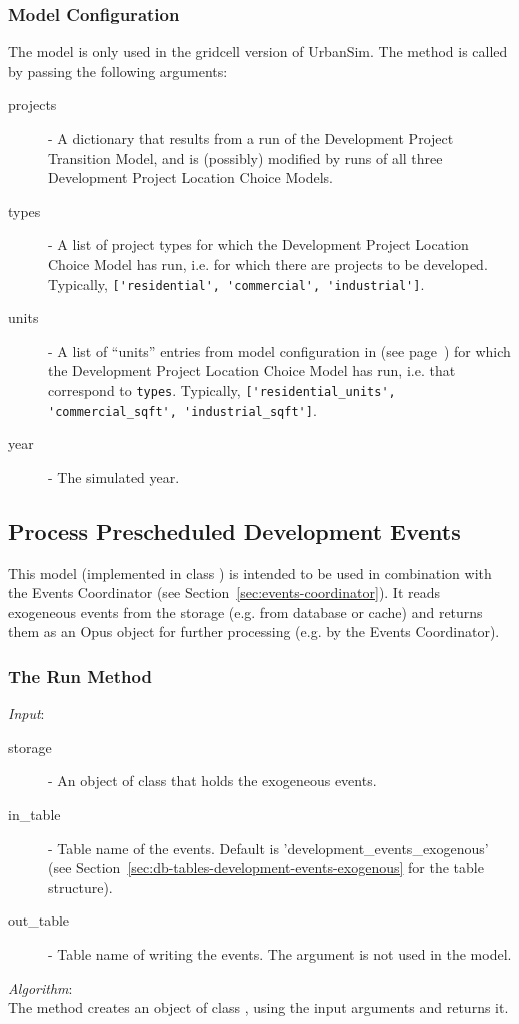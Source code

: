 \subsubsection{Model Configuration}
%
The model is only used in the gridcell version of UrbanSim.
The  method is called by
passing the following arguments:
\begin{description}
\item[projects] - A dictionary that results from a run of the Development
  Project Transition Model,  and is (possibly) modified by runs of all three
  Development Project Location Choice Models. 
\item[types] - A list of project types for which the Development Project
  Location Choice Model has run, i.e. for which there are projects to be
  developed. Typically, \verb|['residential', 'commercial', 'industrial']|.
\item[units] - A list of ``units'' entries from model configuration in
   (see page~\pageref{page:model-configuration}) for which the
  Development Project Location Choice Model has run, i.e. that correspond to
  \verb|types|. Typically, \verb|['residential_units', 'commercial_sqft', 'industrial_sqft']|.
\item[year] - The simulated year.
\end{description}

%
\subsection{Process Prescheduled Development Events}
%
\label{sec:process-prescheduled-development-events}
%
This model (implemented in class  )
is intended to be used in combination with the Events Coordinator (see Section~\ref{sec:events-coordinator}).
It reads exogeneous events from the storage (e.g. from database or cache) and returns them as an Opus object for further
processing (e.g. by the Events Coordinator).

%
\subsubsection{The Run Method}
%
{\it Input}:
\begin{description}
\item[storage] - An object of class  that holds the exogeneous events.
\item[in_table] - Table name of the events. Default is 'development_events_exogenous' 
(see Section~\ref{sec:db-tables-development-events-exogenous} for the table structure).
\item[out_table] -  Table name of writing the events. The argument is not used in the model.
\end{description}
%
{\it Algorithm}:\\[1mm]
The method creates an object of class , using the 
input arguments and returns it.

